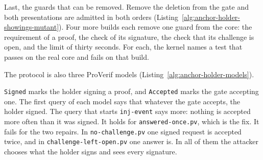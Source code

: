 Last, the guards that can be removed. Remove the deletion from the gate and
both presentations are admitted in both orders
(Listing~\ref{alg:anchor-holder-showings-mutant}).
Four more builds each remove one guard from the core: the requirement of a
proof, the check of its signature, the check that its challenge is open,
and the limit of thirty seconds. For each, the kernel names a test that
passes on the real core and fails on that build.


The protocol is also three ProVerif models
(Listing~\ref{alg:anchor-holder-models}).


\texttt{Signed} marks the holder signing a proof, and \texttt{Accepted}
marks the gate accepting one. The first query of each model says that
whatever the gate accepts, the holder signed. The query that starts
\texttt{inj-event} says more: nothing is accepted more often than it was
signed. It holds for \texttt{answered-once.pv}, which is the fix. It fails
for the two repairs. In \texttt{no-challenge.pv} one signed request is
accepted twice, and in \texttt{challenge-left-open.pv} one answer is. In all
of them the attacker chooses what the holder signs and sees every signature.

